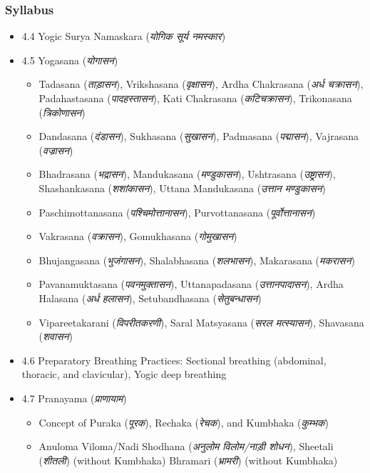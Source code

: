 \begin{frame}[fragile]\frametitle{Syllabus}

\begin{itemize}
\item 4.4  Yogic Surya Namaskara (\textit{योगिक सूर्य नमस्कार})   
\item 4.5  Yogasana (\textit{योगासन}) 
	\begin{itemize}
	\item Tadasana (\textit{ताड़ासन}), Vrikshasana (\textit{वृक्षासन}), Ardha Chakrasana (\textit{अर्ध चक्रासन}), Padahastasana (\textit{पादहस्तासन}), Kati Chakrasana (\textit{कटिचक्रासन}), Trikonasana (\textit{त्रिकोणासन})  
	\item Dandasana (\textit{दंडासन}), Sukhasana (\textit{सुखासन}), Padmasana (\textit{पद्मासन}), Vajrasana (\textit{वज्रासन})
	\item Bhadrasana (\textit{भद्रासन}), Mandukasana (\textit{मण्डुकासन}), Ushtrasana (\textit{उष्ट्रासन}), Shashankasana (\textit{शशांकासन}), Uttana Mandukasana (\textit{उत्तान मण्डुकासन}) 
	\item Paschimottanasana (\textit{पश्चिमोत्तानासन}), Purvottanasana (\textit{पूर्वोत्तानासन}) 
	\item Vakrasana (\textit{वक्रासन}), Gomukhasana (\textit{गोमुखासन}) 
	\item Bhujangasana (\textit{भुजंगासन}), Shalabhasana (\textit{शलभासन}), Makarasana (\textit{मकरासन}) 
	\item Pavanamuktasana (\textit{पवनमुक्तासन}), Uttanapadasana (\textit{उत्तानपादासन}), Ardha Halasana (\textit{अर्ध हलासन}), Setubandhasana (\textit{सेतुबन्धासन}) 
	\item Vipareetakarani (\textit{विपरीतकरणी}), Saral Matsyasana (\textit{सरल मत्स्यासन}), Shavasana (\textit{शवासन})  
	\end{itemize}

\item 4.6  Preparatory Breathing Practices: Sectional breathing (abdominal, thoracic, and clavicular), Yogic deep breathing
	
\item 4.7  Pranayama (\textit{प्राणायाम}) 
	\begin{itemize}
	\item Concept of Puraka (\textit{पूरक}), Rechaka (\textit{रेचक}), and Kumbhaka (\textit{कुम्भक}) 
	\item Anuloma Viloma/Nadi Shodhana (\textit{अनुलोम विलोम/नाड़ी शोधन}), Sheetali (\textit{शीतली}) (without Kumbhaka) Bhramari (\textit{भ्रामरी}) (without Kumbhaka) 
	\end{itemize}
	
\end{itemize}
\end{frame}

